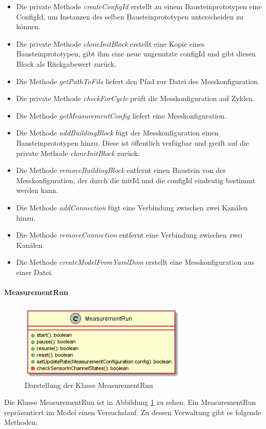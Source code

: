\documentclass[parskip=full]{scrartcl}
\begin{document}
\begin{itemize}

\item Die private Methode \textit{createConfigId} erstellt zu einem Bausteinprototypen eine ConfigId, um Instanzen des selben Bausteinprototypen unterscheiden zu können.
\item Die private Methode \textit{cloneInitBlock} erstellt eine Kopie eines Bausteinprototypen, gibt ihm eine neue ungenutzte configId und gibt diesen Block als Rückgabewert zurück.
\item Die Methode \textit{getPathToFile} liefert den Pfad zur Datei des Messkonfiguration.
\item Die private Methode \textit{checkForCycle} prüft die Messkonfiguration auf Zyklen.
\item Die Methode \textit{getMeasurementConfig} liefert eine Messkonfiguration.
\item Die Methode \textit{addBuildingBlock} fügt der Messkonfiguration einen Bausteinprototypen hinzu. Diese ist öffentlich verfügbar und greift auf die private Methode \textit{cloneInitBlock} zurück.
\item Die Methode \textit{removeBuildingBlock} entfernt einen Baustein von der Messkonfiguration, der durch die initId und die configId eindeutig bestimmt werden kann.
\item Die Methode \textit{addConnection} fügt eine Verbindung zwischen zwei Kanälen hinzu.
\item Die Methode \textit{removeConnection} entfernt eine Verbindung zwischen zwei Kanälen.
\item Die Methode \textit{createModelFromYamlDom} erstellt eine Messkonfiguration aus einer Datei.

\end{itemize}




\paragraph{MeasurementRun}
\begin{figure}[htbp]
	\begin{center}
		\includegraphics[width = 8cm]{Grafiken/MeasurementRun.png}
		\caption{Darstellung der Klasse MeasurementRun}
		\label{MeasurementRun}
	\end{center}
\end{figure}
Die Klasse MeasurementRun ist in Abbildung \ref{MeasurementRun} zu sehen. Ein MeasurementRun repräsentiert im Model einen Versuchslauf. Zu dessen Verwaltung gibt es folgende Methoden:
\end{document}
